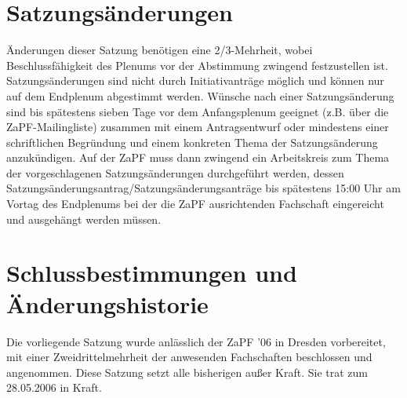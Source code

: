 \documentclass[draft,12pt,oneside]{scrreprt}
\begin{document}
\section{Satzungsänderungen}
Änderungen dieser Satzung benötigen eine 2/3-Mehrheit, wobei Beschlussfähigkeit
des Plenums vor der Abstimmung zwingend festzustellen ist. Satzungsänderungen
sind nicht durch Initiativanträge möglich und können nur auf dem Endplenum
abgestimmt werden. Wünsche nach einer Satzungsänderung sind bis spätestens
sieben Tage vor dem Anfangsplenum geeignet (z.B. über die ZaPF-Mailingliste)
zusammen mit einem Antragsentwurf oder mindestens einer schriftlichen
Begründung und einem konkreten Thema der Satzungsänderung anzukündigen. Auf der
ZaPF muss dann zwingend ein Arbeitskreis zum Thema der vorgeschlagenen
Satzungsänderungen durchgeführt werden, dessen
Satzungsänderungsantrag/Satzungsänderungsanträge bis spätestens 15:00 Uhr am
Vortag des Endplenums bei der die ZaPF ausrichtenden Fachschaft eingereicht und
ausgehängt werden müssen.

\section*{Schlussbestimmungen und Änderungshistorie}
Die vorliegende Satzung wurde anlässlich der ZaPF '06 in Dresden vorbereitet,
mit einer Zweidrittelmehrheit der anwesenden Fachschaften beschlossen und
angenommen. Diese Satzung setzt alle bisherigen außer Kraft. Sie trat zum
28.05.2006 in Kraft.
\end{document}
